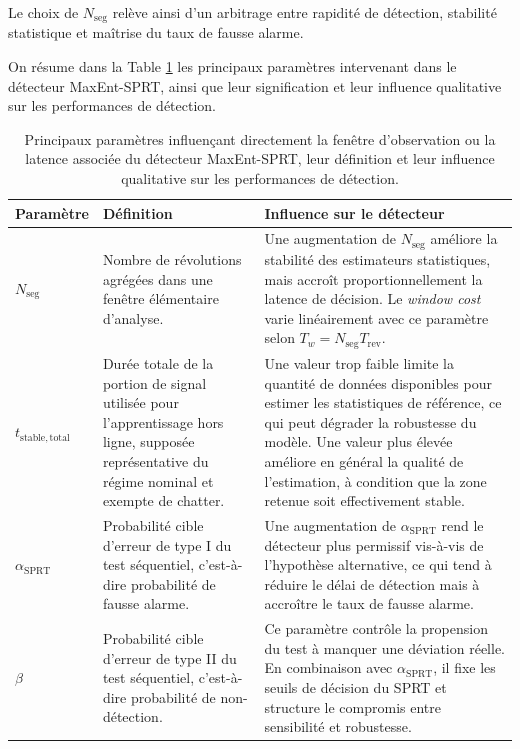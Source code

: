 \documentclass[12pt,a4paper, openany]{book}
\begin{document}
Le choix de $N_{\mathrm{seg}}$ relève ainsi d'un arbitrage entre rapidité de détection, stabilité statistique et maîtrise du taux de fausse alarme.
\medskip


On résume dans la Table \ref{tab:maxent_sprt_parameters_2} les principaux paramètres intervenant dans le détecteur MaxEnt-SPRT, ainsi que leur signification et leur influence qualitative sur les performances de détection.

\begin{table}[!ht]
\centering
\caption{Principaux paramètres influençant directement la fenêtre d'observation ou la latence associée du détecteur MaxEnt-SPRT, leur définition et leur influence qualitative sur les performances de détection.}
\label{tab:maxent_sprt_parameters_2}
\begin{tabularx}{\textwidth}{|l|>{\raggedright\arraybackslash}X|>{\raggedright\arraybackslash}X|}
\hline
\textbf{Paramètre} & \textbf{Définition} & \textbf{Influence sur le détecteur} \\
\hline
$N_{\mathrm{seg}}$ & Nombre de révolutions agrégées dans une fenêtre élémentaire d'analyse. & Une augmentation de $N_{\mathrm{seg}}$ améliore la stabilité des estimateurs statistiques, mais accroît proportionnellement la latence de décision. Le \textit{window cost} varie linéairement avec ce paramètre selon $T_w = N_{\mathrm{seg}} T_{\mathrm{rev}}$. \\
\hline
$t_{\mathrm{stable,total}}$ & Durée totale de la portion de signal utilisée pour l'apprentissage hors ligne, supposée représentative du régime nominal et exempte de chatter. & Une valeur trop faible limite la quantité de données disponibles pour estimer les statistiques de référence, ce qui peut dégrader la robustesse du modèle. Une valeur plus élevée améliore en général la qualité de l'estimation, à condition que la zone retenue soit effectivement stable. \\
\hline
$\alpha_{\mathrm{SPRT}}$ & Probabilité cible d'erreur de type I du test séquentiel, c'est-à-dire probabilité de fausse alarme. & Une augmentation de $\alpha_{\mathrm{SPRT}}$ rend le détecteur plus permissif vis-à-vis de l'hypothèse alternative, ce qui tend à réduire le délai de détection mais à accroître le taux de fausse alarme. \\
\hline
$\beta$ & Probabilité cible d'erreur de type II du test séquentiel, c'est-à-dire probabilité de non-détection. & Ce paramètre contrôle la propension du test à manquer une déviation réelle. En combinaison avec $\alpha_{\mathrm{SPRT}}$, il fixe les seuils de décision du SPRT et structure le compromis entre sensibilité et robustesse. \\
\hline
\end{tabularx}
\end{table}
\end{document}
